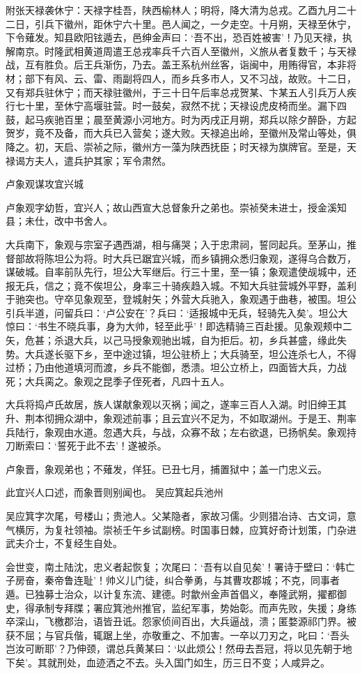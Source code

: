 \documentclass[]{article}
\begin{document}
附张天禄袭休宁：天禄字桂吾，陕西榆林人；明将，降大清为总戎。乙酉九月二十二日，引兵下徽州，距休宁六十里。邑人闻之，一夕走空。十月朔，天禄至休宁，下令薙发。知县欧阳铉遁去，邑绅金声曰：`吾不出，恐百姓被害'！乃见天禄，执解南京。时隆武相黄道周遣王总戎率兵千六百人至徽州，义旅从者复数千；与天禄战，互有胜负。后王兵渐伤，乃去。盖王系杭州丝客，诣闽中，用贿得官，本非将材；部下有风、云、雷、雨副将四人，而乡兵多市人，又不习战，故败。十二日，又有郑兵驻休宁；而天禄驻徽州，于三十日午后率总戎贺某、卞某五人引兵万人疾行七十里，至休宁高堰驻营。时一鼓矣，寂然不扰；天禄设虎皮椅而坐。漏下四鼓，起马疾驰百里；晨至黄源小河地方。时为丙戌正月朔，郑兵以除夕醉卧，方起贺岁，竟不及备，而大兵已入营矣；遂大败。天禄追出岭，至徽州及常山等处，俱降之。初，天启、崇祯之际，徽州方一藻为陕西抚臣；时天禄为旗牌官。至是，天禄谒方夫人，遣兵护其家；军令肃然。

卢象观谋攻宜兴城

卢象观字幼哲，宜兴人；故山西宣大总督象升之弟也。崇祯癸未进士，授金溪知县；未仕，改中书舍人。

大兵南下，象观与宗室子遇西湖，相与痛哭；入于忠肃祠，誓同起兵。至茅山，推督部故将陈坦公为将。时大兵已踞宜兴城，而乡镇拥众悉归象观，遂得乌合数万，谋破城。自率前队先行，坦公大军继后。行三十里，至一镇；象观遣使觇城中，还报无兵，信之；竟不俟坦公，身率三十骑疾趋入城。不知大兵驻营城外平野，盖利于驰突也。守卒见象观至，登城射矢；外营大兵驰入，象观遇于曲巷，被围。坦公引兵半道，问留兵曰：`卢公安在'？兵曰：`适报城中无兵，轻骑先入矣'。坦公大惊曰：`书生不晓兵事，身为大帅，轻至此乎'！即选精骑三百赴援。见象观颊中二矢，危甚；杀退大兵，以己马授象观驰出城，自为拒后。初，乡兵甚盛，缘此失势。大兵遂长驱下乡，至中途过镇，坦公驻桥上；大兵骑至，坦公连杀七人，不得过桥；乃由他道填河而渡，乡兵不能御，悉溃。坦公立桥上，四面皆大兵，力战死；大兵脔之。象观之昆季子侄死者，凡四十五人。

大兵将捣卢氏故居，族人谋献象观以灭祸；闻之，遂率三百人入湖。时旧绅王其升、荆本彻拥众湖中，象观述前事；且云宜兴不足为，不如取湖州。于是王、荆率兵陆行，象观由水道。忽遇大兵，与战，众寡不敌；左右欲退，已扬帆矣。象观持刀断索曰：`誓死于此不去'！遂被杀。

卢象晋，象观弟也；不薙发，佯狂。已丑七月，捕置狱中；盖一门忠义云。

此宜兴人口述，而象晋则别闻也。 吴应箕起兵池州

吴应箕字次尾，号楼山；贵池人。父某隐者，家故习儒。少则猎冶诗、古文词，意气横厉，为复社领袖。崇祯壬午乡试副榜。时国事日棘，应箕好奇计划策，门杂进武夫介士，不复经生自处。

会世变，南土陆沈，忠义者起恢复；次尾曰：`吾有以自见矣'！署诗于壁曰：`韩亡子房奋，秦帝鲁连耻'！帅义儿门徒，纠合拳勇，与其曹攻郡城；不克，同事者遁。已独募士治众，以计复东流、建德。时歙州金声首倡义，奉隆武朔，擢都御史，得承制专拜牒；署应箕池州推官，监纪军事，势始彰。而声先败，失援；身练卒深山，飞檄郡治，语皆丑诋。怨家侦间百出，大兵逼战，溃；匿婺源祁门界。被获不屈；与官兵偕，辄踞上坐，亦敬重之、不加害。一卒以刀刃之，叱曰：`吾头岂汝可断耶'？乃伸颈，谓总兵黄某曰：`以此烦公！然毋去吾冠，将以见先朝于地下矣'。其就刑处，血迹洒之不去。头入国门如生，历三日不变；人咸异之。
\end{document}
